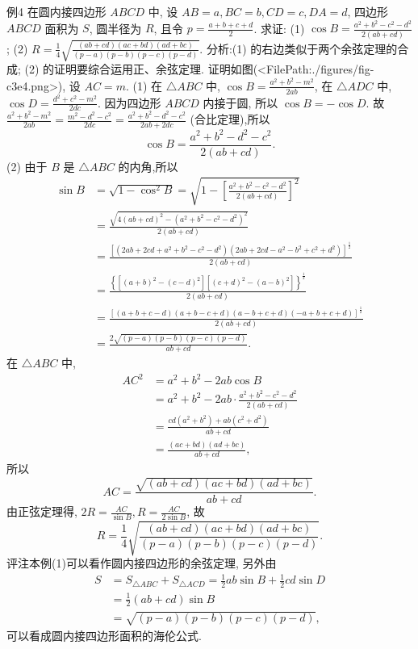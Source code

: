 例4 在圆内接四边形 $A B C D$ 中, 设 $A B=a, B C=b, C D=c, D A= d$, 四边形 $A B C D$ 面积为 $S$, 圆半径为 $R$, 且令 $p=\frac{a+b+c+d}{2}$.
求证: (1) $\cos B=\frac{a^2+b^2-c^2-d^2}{2(a b+c d)}$;
(2) $R=\frac{1}{4} \sqrt{\frac{(a b+c d)(a c+b d)(a d+b c)}{(p-a)(p-b)(p-c)(p-d)}}$.
分析:(1) 的右边类似于两个余弦定理的合成; (2) 的证明要综合运用正、余弦定理.
证明如图(<FilePath:./figures/fig-c3e4.png>), 设 $A C=m$.
(1) 在 $\triangle A B C$ 中, $\cos B=\frac{a^2+b^2-m^2}{2 a b}$, 在 $\triangle A D C$ 中, $\cos D=\frac{d^2+c^2-m^2}{2 d c}$.
因为四边形 $A B C D$ 内接于圆, 所以 $\cos B=-\cos D$.
故 $\frac{a^2+b^2-m^2}{2 a b}=\frac{m^2-d^2-c^2}{2 d c}=\frac{a^2+b^2-d^2-c^2}{2 a b+2 d c}$ (合比定理),所以
$$
\cos B=\frac{a^2+b^2-d^2-c^2}{2(a b+c d)} .
$$
(2) 由于 $B$ 是 $\triangle A B C$ 的内角,所以
$$
\begin{aligned}
\sin B & =\sqrt{1-\cos ^2 B}=\sqrt{1-\left[\frac{a^2+b^2-c^2-d^2}{2(a b+c d)}\right]^2} \\
& =\frac{\sqrt{4(a b+c d)^2-\left(a^2+b^2-c^2-d^2\right)^2}}{2(a b+c d)} \\
& =\frac{\left[\left(2 a b+2 c d+a^2+b^2-c^2-d^2\right)\left(2 a b+2 c d-a^2-b^2+c^2+d^2\right)\right]^{\frac{1}{2}}}{2(a b+c d)} \\
& =\frac{\left\{\left[(a+b)^2-(c-d)^2\right]\left[(c+d)^2-(a-b)^2\right]\right\}^{\frac{1}{2}}}{2(a b+c d)} \\
& =\frac{[(a+b+c-d)(a+b-c+d)(a-b+c+d)(-a+b+c+d)]^{\frac{1}{2}}}{2(a b+c d)} \\
& =\frac{2 \sqrt{(p-a)(p-b)(p-c)(p-d)}}{a b+c d} .
\end{aligned}
$$
在 $\triangle A B C$ 中,
$$
\begin{aligned}
A C^2 & =a^2+b^2-2 a b \cos B \\
& =a^2+b^2-2 a b \cdot \frac{a^2+b^2-c^2-d^2}{2(a b+c d)} \\
& =\frac{c d\left(a^2+b^2\right)+a b\left(c^2+d^2\right)}{a b+c d} \\
& =\frac{(a c+b d)(a d+b c)}{a b+c d},
\end{aligned}
$$
所以
$$
A C=\frac{\sqrt{(a b+c d)(a c+b d)(a d+b c)}}{a b+c d} .
$$
由正弦定理得, $2 R=\frac{A C}{\sin B}, R=\frac{A C}{2 \sin B}$, 故
$$
R=\frac{1}{4} \sqrt{\frac{(a b+c d)(a c+b d)(a d+b c)}{(p-a)(p-b)(p-c)(p-d)}} .
$$
评注本例(1)可以看作圆内接四边形的余弦定理, 另外由
$$
\begin{aligned}
S & =S_{\triangle A B C}+S_{\triangle A C D}=\frac{1}{2} a b \sin B+\frac{1}{2} c d \sin D \\
& =\frac{1}{2}(a b+c d) \sin B \\
& =\sqrt{(p-a)(p-b)(p-c)(p-d)},
\end{aligned}
$$
可以看成圆内接四边形面积的海伦公式.



